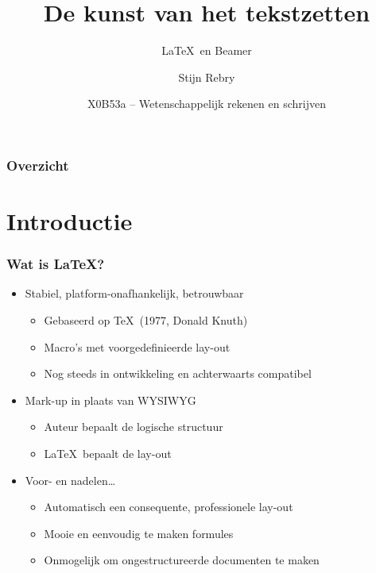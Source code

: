 \documentclass[aspectratio=169,kulak,t,handout]{kulakbeamer} %
\title[\LaTeX\ en Beamer]{De kunst van het tekstzetten}
\subtitle{\LaTeX\ en Beamer}
\author{Stijn Rebry}
\institute[Kulak]{Groep Wetenschap \& Technologie, Kulak}
\date{X0B53a -- Wetenschappelijk rekenen en schrijven}
\begin{document}
	
	\begin{titleframe}
	\titlepage
\end{titleframe}

\begin{outlineframe}
	\frametitle{Overzicht} %
	{
		\hypersetup{hidelinks} %
		\hfill	{\large\parbox{.95\textwidth}{\tableofcontents[subsectionstyle=hide/hide/hide]}}
	}
\end{outlineframe}

\section{Introductie}

\begin{frame}[t]
\frametitle{Wat is LaTeX?}
\begin{itemize}
	\item Stabiel, platform-onafhankelijk, betrouwbaar
	\begin{itemize}
		\item Gebaseerd op \TeX\ (1977, Donald Knuth)
		\item Macro's met voorgedefinieerde lay-out
		\item Nog steeds in ontwikkeling en achterwaarts compatibel
	\end{itemize}
	\item Mark-up in plaats van WYSIWYG
	\begin{itemize}
		\item Auteur bepaalt de logische structuur
		\item \LaTeX\ bepaalt de lay-out
	\end{itemize}
	\item Voor- en nadelen\ldots
	\begin{itemize}
		\item Automatisch een consequente, professionele lay-out
		\item Mooie en eenvoudig te maken formules
		\item Onmogelijk om ongestructureerde documenten te maken
	\end{itemize}
\end{itemize}
\end{frame}

\end{document}
